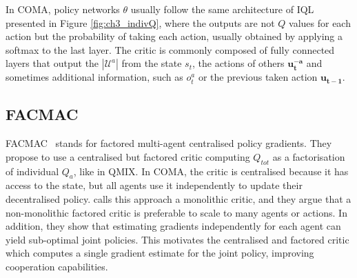 In COMA, policy networks $\theta$ usually follow the same architecture of IQL presented in Figure \ref{fig:ch3_indivQ}, where the outputs are not $Q$ values for each action but the probability of taking each action, usually obtained by applying a softmax to the last layer.
The critic is commonly composed of fully connected layers that output the $|\mathcal{U}^a|$ from the state $s_t$, the actions of others $\mathbf{u_t^{-a}}$ and sometimes additional information, such as $o_t^a$ or the previous taken action $\mathbf{u_{t-1}}$.

\subsection{FACMAC}

FACMAC~\citep{peng2021facmac} stands for factored multi-agent centralised policy gradients.
They propose to use a centralised but factored critic computing $Q_{tot}$ as a factorisation of individual $Q_a$, like in QMIX.
In COMA, the critic is centralised because it has access to the state, but all agents use it independently to update their decentralised policy.
\cite{peng2021facmac} calls this approach a monolithic critic, and they argue that a non-monolithic factored critic is preferable to scale to many agents or actions.
In addition, they show that estimating gradients independently for each agent can yield sub-optimal joint policies.
This motivates the centralised and factored critic which computes a single gradient estimate for the joint policy, improving cooperation capabilities.

